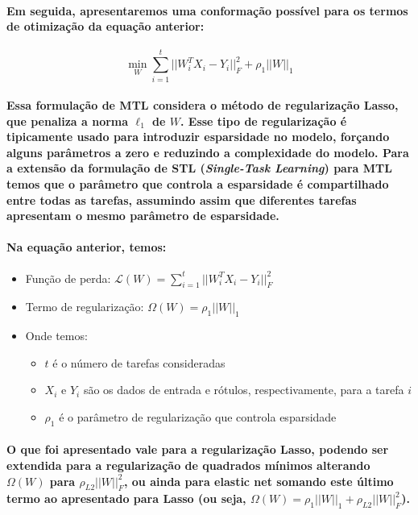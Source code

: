 \documentclass[a4paper]{article}    %
\begin{document}
\paragraph{Em seguida, apresentaremos uma conformação possível para os termos de otimização da equação anterior:}

\[\min_W \sum_{i=1}^{t} ||W_i^T X_i - Y_i||_F^2 + \rho_1||W||_1\]

\paragraph{Essa formulação de MTL considera o método de regularização Lasso, que penaliza a norma $\ell_1$ de $W$. Esse tipo de regularização é tipicamente usado para introduzir esparsidade no modelo, forçando alguns parâmetros a zero e reduzindo a complexidade do modelo. Para a extensão da formulação de STL (\emph{Single-Task Learning}) para MTL temos que o parâmetro que controla a esparsidade é compartilhado entre todas as tarefas, assumindo assim que diferentes tarefas apresentam o mesmo parâmetro de esparsidade.}

\paragraph{Na equação anterior, temos:}
\begin{itemize}
    \item Função de perda: $\mathcal{L}(W) = \sum_{i=1}^{t} ||W_i^T X_i - Y_i||_F^2$
    \item Termo de regularização: $\Omega(W) = \rho_1||W||_1$
    \item Onde temos:
    \begin{itemize}
        \item $t$ é o número de tarefas consideradas
        \item $X_i$ e $Y_i$ são os dados de entrada e rótulos, respectivamente, para a tarefa $i$
        \item $\rho_1$ é o parâmetro de regularização que controla esparsidade
    \end{itemize}
\end{itemize}

\paragraph{O que foi apresentado vale para a regularização Lasso, podendo ser extendida para a regularização de quadrados mínimos alterando $\Omega(W)$ para $\rho_{L2}||W||_F^2$, ou ainda para elastic net somando este último termo ao apresentado para Lasso (ou seja, $\Omega(W) = \rho_1 ||W||_1 + \rho_{L2}||W||_F^2$).}
\end{document}
